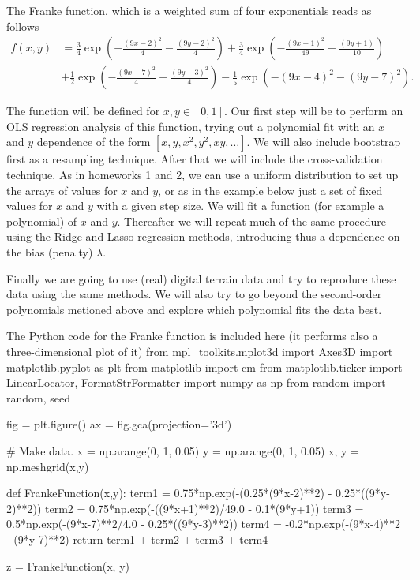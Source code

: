 \documentclass[%
oneside,                 %
final,                   %
10pt]{article}
\begin{document}
The Franke function, which is a weighted sum of four exponentials  reads as follows
\begin{align*}
f(x,y) &= \frac{3}{4}\exp{\left(-\frac{(9x-2)^2}{4} - \frac{(9y-2)^2}{4}\right)}+\frac{3}{4}\exp{\left(-\frac{(9x+1)^2}{49}- \frac{(9y+1)}{10}\right)} \\
&+\frac{1}{2}\exp{\left(-\frac{(9x-7)^2}{4} - \frac{(9y-3)^2}{4}\right)} -\frac{1}{5}\exp{\left(-(9x-4)^2 - (9y-7)^2\right) }.
\end{align*}

The function will be defined for $x,y\in [0,1]$.  Our first step will
be to perform an OLS regression analysis of this function, trying out
a polynomial fit with an $x$ and $y$ dependence of the form $[x, y,
x^2, y^2, xy, \dots]$. We will also include bootstrap first as
a resampling technique.  After that we will include the cross-validation technique. As in homeworks 1 and 2, we can use a uniform
distribution to set up the arrays of values for $x$ and $y$, or as in
the example below just a set of fixed 
values for $x$ and $y$ with a given step
size.  We will fit a
function (for example a polynomial) of $x$ and $y$.  Thereafter we
will repeat much of the same procedure using the Ridge and Lasso
regression methods, introducing thus a dependence on the bias
(penalty) $\lambda$.

Finally we are going to use (real) digital terrain data and try to
reproduce these data using the same methods. We will also try to go
beyond the second-order polynomials metioned above and explore 
which polynomial fits the data best.


The Python code for the Franke function is included here (it performs also a three-dimensional plot of it)
\bpycod
from mpl_toolkits.mplot3d import Axes3D
import matplotlib.pyplot as plt
from matplotlib import cm
from matplotlib.ticker import LinearLocator, FormatStrFormatter
import numpy as np
from random import random, seed

fig = plt.figure()
ax = fig.gca(projection='3d')

# Make data.
x = np.arange(0, 1, 0.05)
y = np.arange(0, 1, 0.05)
x, y = np.meshgrid(x,y)


def FrankeFunction(x,y):
    term1 = 0.75*np.exp(-(0.25*(9*x-2)**2) - 0.25*((9*y-2)**2))
    term2 = 0.75*np.exp(-((9*x+1)**2)/49.0 - 0.1*(9*y+1))
    term3 = 0.5*np.exp(-(9*x-7)**2/4.0 - 0.25*((9*y-3)**2))
    term4 = -0.2*np.exp(-(9*x-4)**2 - (9*y-7)**2)
    return term1 + term2 + term3 + term4


z = FrankeFunction(x, y)
\end{document}
